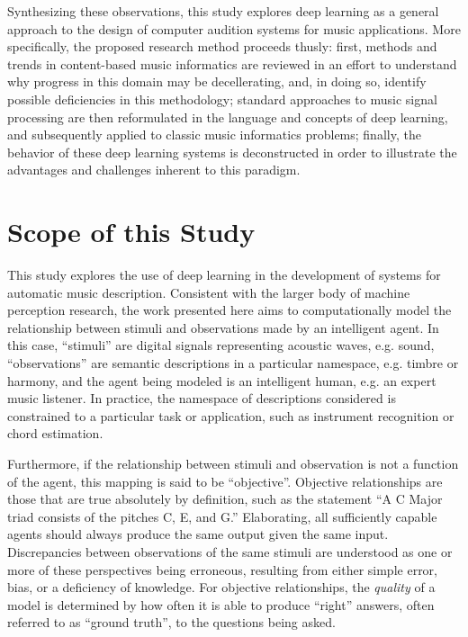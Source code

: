 Synthesizing these observations, this study explores deep learning as a general approach to the design of computer audition systems for music applications.
More specifically, the proposed research method proceeds thusly:
first, methods and trends in content-based music informatics are reviewed in an effort to understand why progress in this domain may be decellerating, and, in doing so, identify possible deficiencies in this methodology;
standard approaches to music signal processing are then reformulated in the language and concepts of deep learning, and subsequently applied to classic music informatics problems;
finally, the behavior of these deep learning systems is deconstructed in order to illustrate the advantages and challenges inherent to this paradigm.


\section{Scope of this Study}
\label{sec:scope}


This study explores the use of deep learning in the development of systems for automatic music description.
Consistent with the larger body of machine perception research, the work presented here aims to computationally model the relationship between stimuli and observations made by an intelligent agent.
In this case, ``stimuli'' are digital signals representing acoustic waves, e.g. sound, ``observations'' are semantic descriptions in a particular namespace, e.g. timbre or harmony, and the agent being modeled is an intelligent human, e.g. an expert music listener.
In practice, the namespace of descriptions considered is constrained to a particular task or application, such as instrument recognition or chord estimation.

Furthermore, if the relationship between stimuli and observation is not a function of the agent, this mapping is said to be ``objective''.
Objective relationships are those that are true absolutely by definition, such as the statement ``A C Major triad consists of the pitches C, E, and G.''
Elaborating, all sufficiently capable agents should always produce the same output given the same input.
Discrepancies between observations of the same stimuli are understood as one or more of these perspectives being erroneous, resulting from either simple error, bias, or a deficiency of knowledge.
For objective relationships, the \emph{quality} of a model is determined by how often it is able to produce ``right'' answers, often referred to as ``ground truth'', to the questions being asked.

